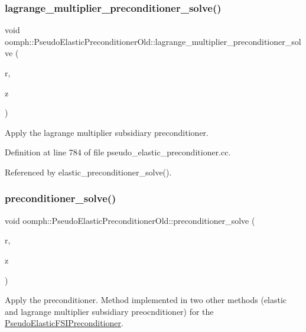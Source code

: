 \subsubsection{\texorpdfstring{lagrange\+\_\+multiplier\+\_\+preconditioner\+\_\+solve()}{lagrange\_multiplier\_preconditioner\_solve()}}
{\footnotesize\ttfamily void oomph\+::\+Pseudo\+Elastic\+Preconditioner\+Old\+::lagrange\+\_\+multiplier\+\_\+preconditioner\+\_\+solve (\begin{DoxyParamCaption}\item[{const Double\+Vector \&}]{r,  }\item[{Double\+Vector \&}]{z }\end{DoxyParamCaption})\hspace{0.3cm}{\ttfamily [private]}}



Apply the lagrange multiplier subsidiary preconditioner. 



Definition at line 784 of file pseudo\+\_\+elastic\+\_\+preconditioner.\+cc.



Referenced by elastic\+\_\+preconditioner\+\_\+solve().

\mbox{\label{classoomph_1_1PseudoElasticPreconditionerOld_a20b548d07e0f4116f59444ccb69d980f}} 
\subsubsection{\texorpdfstring{preconditioner\+\_\+solve()}{preconditioner\_solve()}}
{\footnotesize\ttfamily void oomph\+::\+Pseudo\+Elastic\+Preconditioner\+Old\+::preconditioner\+\_\+solve (\begin{DoxyParamCaption}\item[{const Double\+Vector \&}]{r,  }\item[{Double\+Vector \&}]{z }\end{DoxyParamCaption})\hspace{0.3cm}{\ttfamily [inline]}}



Apply the preconditioner. Method implemented in two other methods (elastic and lagrange multiplier subsidiary preocnditioner) for the \hyperlink{classoomph_1_1PseudoElasticFSIPreconditioner}{Pseudo\+Elastic\+F\+S\+I\+Preconditioner}. 



